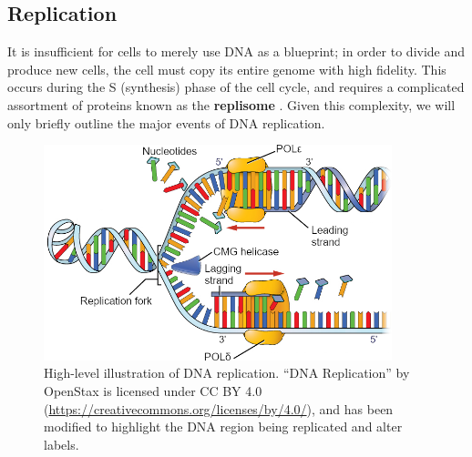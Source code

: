 \subsection{Replication}
\label{ssec:intro:dna_replication}
It is insufficient for cells to merely use DNA as a blueprint; in order to divide and produce new cells, the cell must copy its entire genome with high fidelity. This occurs during the S (synthesis) phase of the cell cycle, and requires a complicated assortment of proteins known as the \textbf{replisome} \cite{bellelli2020}. Given this complexity, we will only briefly outline the major events of DNA replication.

\begin{figure}[htb]
    \centering
    \includegraphics[width=0.9\textwidth,keepaspectratio]{images/intro/0323_DNA_Replication_altered}
    \caption[High-level illustration of DNA replication.]{High-level illustration of DNA replication. ``DNA Replication'' \cite{betts2013} by OpenStax is licensed under CC BY 4.0 (\url{https://creativecommons.org/licenses/by/4.0/}), and has been modified to highlight the DNA region being replicated and alter labels.}
    \label{fig:intro:replication_schematic}
\end{figure}
